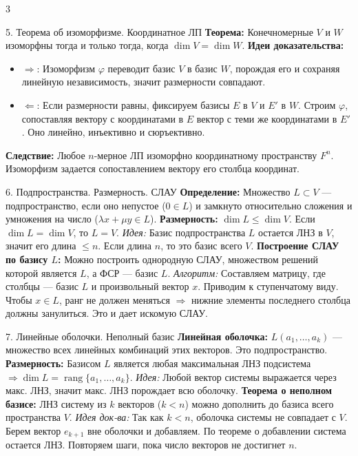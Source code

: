 \documentclass[8pt, a4paper, landscape]{extarticle}
\newcommand{\Ra}{\Rightarrow}
\begin{document}
\begin{multicols*}{3}
\begin{ticket}{5. Теорема об изоморфизме. Координатное ЛП}
\textbf{Теорема:} Конечномерные $V$ и $W$ изоморфны тогда и только тогда, когда $\dim V = \dim W$.
\tcblower
\textbf{Идеи доказательства:}
\begin{itemize}
    \item $\Rightarrow$: Изоморфизм $\varphi$ переводит базис $V$ в базис $W$, порождая его и сохраняя линейную независимость, значит размерности совпадают.
    \item $\Leftarrow$: Если размерности равны, фиксируем базисы $E$ в $V$ и $E'$ в $W$. Строим $\varphi$, сопоставляя вектору с координатами в $E$ вектор с теми же координатами в $E'$. Оно линейно, инъективно и сюръективно.
\end{itemize}
\textbf{Следствие:} Любое $n$-мерное ЛП изоморфно координатному пространству $F^n$. Изоморфизм задается сопоставлением вектору его столбца координат.
\end{ticket}

\begin{ticket}{6. Подпространства. Размерность. СЛАУ}
\textbf{Определение:} Множество $L \subset V$ --- подпространство, если оно непустое ($0 \in L$) и замкнуто относительно сложения и умножения на число ($\lambda x + \mu y \in L$).
\textbf{Размерность:} $\dim L \le \dim V$. Если $\dim L = \dim V$, то $L = V$.
\textit{Идея:} Базис подпространства $L$ остается ЛНЗ в $V$, значит его длина $\le n$. Если длина $n$, то это базис всего $V$.
\tcblower
\textbf{Построение СЛАУ по базису $L$:}
Можно построить однородную СЛАУ, множеством решений которой является $L$, а ФСР --- базис $L$.
\textit{Алгоритм:} Составляем матрицу, где столбцы --- базис $L$ и произвольный вектор $x$. Приводим к ступенчатому виду. Чтобы $x \in L$, ранг не должен меняться $\Ra$ нижние элементы последнего столбца должны занулиться. Это и дает искомую СЛАУ.
\end{ticket}

\begin{ticket}{7. Линейные оболочки. Неполный базис}
\textbf{Линейная оболочка:} $L(a_1, \dots, a_k)$ --- множество всех линейных комбинаций этих векторов. Это подпространство.
\textbf{Размерность:} Базисом $L$ является любая максимальная ЛНЗ подсистема $\Ra \dim L = \operatorname{rang}\{a_1, \dots, a_k\}$.
\textit{Идея:} Любой вектор системы выражается через макс. ЛНЗ, значит макс. ЛНЗ порождает всю оболочку.
\tcblower
\textbf{Теорема о неполном базисе:}
ЛНЗ систему из $k$ векторов ($k < n$) можно дополнить до базиса всего пространства $V$.
\textit{Идея док-ва:} Так как $k < n$, оболочка системы не совпадает с $V$. Берем вектор $e_{k+1}$ вне оболочки и добавляем. По теореме о добавлении система остается ЛНЗ. Повторяем шаги, пока число векторов не достигнет $n$.
\end{ticket}


\end{multicols*}
\end{document}
